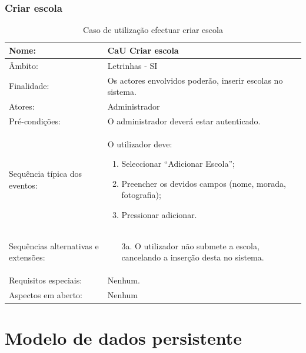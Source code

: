 \documentclass[a4paper]{article}
\begin{document}
	\subsubsection{Criar escola}
			\begin {table}[h]
									\begin{tabular}{|p{2cm} p{10cm}|}
										\hline Nome: & CaU Criar escola\\ 
										\hline Âmbito: & Letrinhas - SI \\ 
										\hline Finalidade: & Os actores envolvidos poderão, inserir escolas no sistema.\\ 
										\hline Atores: & Administrador \\ 
									    \hline Pré-condições: & O administrador deverá estar autenticado.\\ 
									    \hline Sequência típica dos eventos: &  					
										O utilizador deve:
									    \begin{enumerate}
									    \item	Seleccionar “Adicionar Escola”;
										\item	Preencher os devidos  campos (nome, morada, fotografia);
										\item	Pressionar adicionar.



		
			
									    \end{enumerate} \\ 
					  				    \hline Sequências alternativas e extensões: & 
					  				    \begin{enumerate}			    	
					  				  \item[3a.] O utilizador não submete a escola, cancelando a inserção desta no sistema.
		
			
					
					  				    \end{enumerate}
					  				     \\ 
					  				    \hline Requisitos especiais: & Nenhum.\\ 
					  				    \hline Aspectos em aberto: & Nenhum  \\
										\hline 
									\end{tabular}
									\caption{Caso de utilização efectuar criar escola}
								\end{table} 
			
		
		\newpage
		
		\section{Modelo de dados persistente}
		
\end{document}
